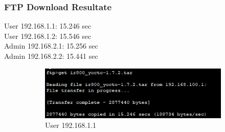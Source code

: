 \subsubsection{FTP Download Resultate}
User 192.168.1.1: 15.246 sec\\
User 192.168.1.2: 15.546 sec\\
Admin 192.168.2.1: 15.256 sec\\
Admin 192.168.2.2: 15.441 sec\\
\begin{figure}[!htb]
    \centering
    \begin{subfigure}{.45\textwidth}
        \includegraphics[width=\textwidth,height=\textwidth,keepaspectratio]{./img/lacp/user1.png}
        \caption{User 192.168.1.1}
    \end{subfigure}
    \begin{subfigure}{.45\textwidth}

\end{subfigure}
\end{figure}
